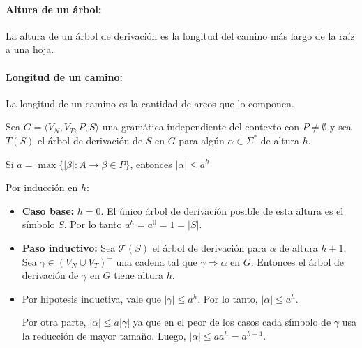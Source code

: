 \paragraph{Altura de un árbol:} La altura de un árbol de derivación es la longitud del camino más largo de la raíz a una hoja.

\paragraph{Longitud de un camino:} La longitud de un camino es la cantidad de arcos que lo componen.

\begin{lemma}\label{lem:altura}
  Sea \(G=\langle V_N, V_T, P, S \rangle\) una gramática independiente del contexto con \(P\neq\emptyset\) y sea \(T(S)\) el árbol de derivación de \(S\) en \(G\) para algún \(\alpha\in\Sigma^*\) de altura \(h\).
  \begin{center}
    Si \(a=\max\{|\beta|: A\to\beta\in P\}\), entonces \(|\alpha|\leq a^h\)
  \end{center}
\end{lemma}

\begin{demo}[0.8\textwidth]
  Por inducción en \(h\):
  \begin{itemize}
    \item \textbf{Caso base:} \(h=0\). El único árbol de derivación posible de esta altura es el símbolo \(S\). Por lo tanto \(a^h = a ^ 0 = 1 = |S|\).
    \item \textbf{Paso inductivo:} Sea \(\mathcal{T}(S)\) el árbol de derivación para \(\alpha\) de altura \(h+1\).  Sea \(\gamma\in(V_N\cup V_T)^+\) una cadena tal que \(\gamma\Rightarrow\alpha\) en \(G\). Entonces el árbol de derivación de \(\gamma\) en \(G\) tiene altura \(h\).


  \end{itemize}
\end{demo}
\begin{demoPart}[0.8\textwidth]
  \begin{itemize}
    \item[]
      Por hipotesis inductiva, vale que \(|\gamma|\leq a^h\). Por lo tanto, \(|\alpha|\leq a^h\).

      Por otra parte, \(|\alpha|\leq a|\gamma|\) ya que en el peor de los casos cada símbolo de \(\gamma\) usa la reducción de mayor tamaño. Luego, \(|\alpha|\leq aa^h = a^{h+1}\).
  \end{itemize}
\end{demoPart}
